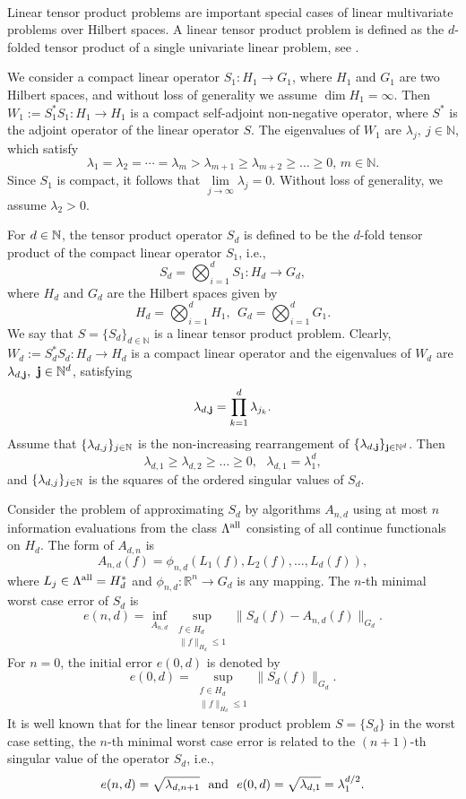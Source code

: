 \documentclass{amsart}
\numberwithin{equation}{section}
\def\lz{\lambda}
\newcommand{\NN}{\mathbb{N}}
\newcommand{\bsj}{\oldsymbol{j}}
\def\NN{{\mathbb N}}
\def\RR{{\mathbb R}}
\def\bsj{{\bf j}}
\begin{document}
\

Linear tensor product problems are
important special cases of linear multivariate problems over
Hilbert spaces. A linear tensor product problem is defined as the $d$-folded
tensor product of a single univariate linear problem, see
\cite[Chapter 5.2]{NW08}.

We consider a compact linear operator $S_1 : H_1\to G_1$, where
$H_1$ and $G_1$ are two Hilbert spaces, and without loss of
generality we assume $\dim H_1=\infty$. Then $W_1 := S_1^* S_1:
H_1 \to H_1$ is a compact self-adjoint non-negative operator,
where $S^*$ is the adjoint operator of the linear operator $S$.
The eigenvalues of $W_1$ are $\lz_j,\ j\in\NN$, which satisfy
$$\lambda_1=\lambda_2=\cdots=\lambda_m>\lambda_{m+1}\ge\lambda_{m+2}\ge\dots\ge0,\, m\in \NN .$$
Since $S_1$ is compact, it follows that
$\lim\limits_{j\to\infty}\lambda_j=0$. Without loss of generality,
we assume $\lz_2>0$.


 For $d\in \Bbb N$, the tensor product operator $S_{d}$ is defined
 to be the $d$-fold tensor product of the
compact linear operator $S_1$, i.e.,
$$S_{d}=\bigotimes_{i=1}^d S_{1}: H_{d}\to G_d,$$
where $H_{d}$ and $G_d$ are the Hilbert spaces given by
$$H_{d}=\bigotimes_{i=1}^dH_{1},\ \
G_d=\bigotimes_{i=1}^d G_1.$$
 We say that $S = \{S_d\}_{d\in\NN}$ is a linear tensor
product problem. Clearly, $W_{d}:=S_{d}^*S_{d}: H_{d}\to H_{d} $
is a compact linear operator and the eigenvalues of $W_{d}$ are
$\lz_{d,\bsj},\ {\bsj\in\NN^d}$, satisfying
$$\lz_{d,\bsj}=\prod_{k=1}^d \lz_{j_k}.$$
Assume that $\{\lambda_{d,j}\}_{j\in\Bbb N}$ is the non-increasing
rearrangement of $\{\lz_{d,\bsj}\}_{\bsj\in \Bbb N^d}$. Then
$$\lz_{d,1}\ge \lz_{d,2}\ge \dots \ge 0, \ \ \
\lz_{d,1}=\lz_1^d,$$and $\{\lz_{d,j}\}_{j\in\Bbb N}$ is the
squares of the ordered singular values of $S_d$.


Consider the problem of approximating $S_d$ by algorithms
$A_{n,d}$ using at most $n$ information evaluations from the class
$\Lambda^{\rm all}$ consisting of all continue functionals on
$H_d$.
 The form of $A_{d,n}$ is
$$
A_{n,d}(f)=\phi_{n,d}(L_1(f),L_2(f),\dots,L_d(f)),
$$
where $L_j\in \Lambda^{\rm all }=H_d^*$ and $\phi_{n,d}:\RR^n \to
G_d$ is any mapping. The $n$-th minimal worst case error of $S_d$
is
$$e(n,d)=\inf_{A_{n,d}}\sup_{\substack{f \in H_{d}\\ \|f\|_{H_{d} } \le
1}}\|S_{d}(f)-A_{n,d}(f)\|_{G_d}.$$ For $n=0$, the initial error
$e(0,d)$ is denoted by
$$ e(0,d)=\sup_{\substack{  f \in H_{d} \\ \|f\|_{H_{d}} \le 1}}\|S_{d}(f)\|_{G_d}.$$
It is well known that for the linear tensor product problem
$S=\{S_d\}$ in the worst case setting, the $n$-th minimal worst
case error is related to the $(n+1)$-th  singular value of the
operator $S_d$, i.e.,
$$e(n,d)=\sqrt{\lambda_{d,n+1}} \ \ {\rm and }\ \  e(0,d)=\sqrt{\lz_{d,1}}=\lz_1^{d/2}.$$
\end{document}
